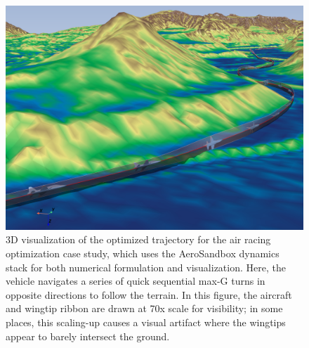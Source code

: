 \begin{figure}[h]
    \centering
    \includegraphics[width=\textwidth]{../figures/air-racing/2.png}
    \caption{3D visualization of the optimized trajectory for the air racing optimization case study, which uses the AeroSandbox dynamics stack for both numerical formulation and visualization. Here, the vehicle navigates a series of quick sequential max-G turns in opposite directions to follow the terrain. In this figure, the aircraft and wingtip ribbon are drawn at 70x scale for visibility; in some places, this scaling-up causes a visual artifact where the wingtips appear to barely intersect the ground.}
    \label{fig:air-racing-2}
\end{figure}

